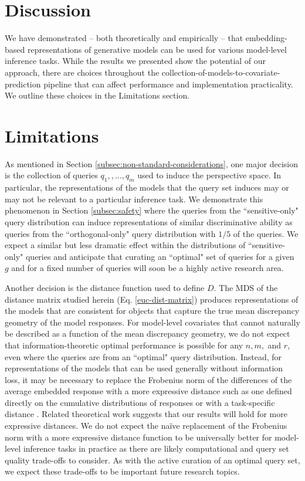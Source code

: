 \vspace{-0.3cm}
\section{Discussion}
\vspace{-0.2cm}
We have demonstrated -- both theoretically and empirically -- that embedding-based representations of generative models can be used for various model-level inference tasks.
While the results we presented show the potential of our approach, there are choices throughout the collection-of-models-to-covariate-prediction pipeline that can affect performance and implementation practicality. 
We outline these choices in the Limitations section.

\section{Limitations}

As mentioned in Section \ref{subsec:non-standard-considerations}, one major decision is the collection of queries $ q_{1},, \hdots, q_{m} $ used to induce the perspective space.
In particular, the representations of the models that the query set induces may or may not be relevant to a particular inference task.
We demonstrate this phenomenon in Section \ref{subsec:safety} where the queries from the ``sensitive-only" query distribution can induce representations of similar discriminative ability as queries from the ``orthogonal-only"  query distribution with $ 1/5 $ of the queries. 
We expect a similar but less dramatic effect within the distributions of ``sensitive-only" queries and anticipate that curating an ``optimal" set of queries for a given $ g $ and for a fixed number of queries will soon be a highly active research area.

Another decision is the distance function used to define $ D $. 
The MDS of the distance matrix studied herein (Eq. \eqref{euc-dist-matrix}) produces representations of the models that are consistent for objects that capture the true mean discrepancy geometry of the model responses.
For model-level covariates that cannot naturally be described as a function of the mean discrepancy geometry, we do not expect that information-theoretic optimal performance is possible for any $ n, m, $ and $ r $, even where the queries are from an ``optimal" query distribution. 
Instead, for representations of the models that can be used generally without information loss, it may be necessary to replace the Frobenius norm of the differences of the average embedded response with a more expressive distance such as one defined directly on the cumulative distributions of responses or with a task-specific distance \citep{helm2020partitionbased}.
Related theoretical work \citep{10.1214/13-AOS1112} suggests that our results will hold for more expressive distances. 
We do not expect the na\"ive replacement of the Frobenius norm with a more expressive distance function to be universally better for model-level inference tasks in practice as there are likely computational and query set quality trade-offs to consider.
As with the active curation of an optimal query set, we expect these trade-offs to be important future research topics.

